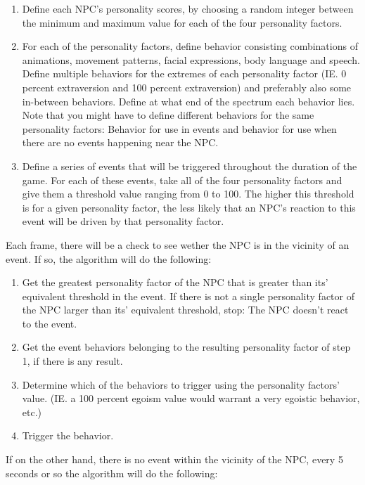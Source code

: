 \documentclass{article}
\begin{document}
    \begin{enumerate}
    	\item Define each NPC's personality scores, by choosing a random integer between the minimum and maximum value for each of the four personality factors.
    	\item For each of the personality factors, define behavior consisting combinations of animations, movement patterns, facial expressions, body language and speech. Define multiple behaviors for the extremes of each personality factor (IE. 0 percent extraversion and 100 percent extraversion) and preferably also some in-between behaviors. Define at what end of the spectrum each behavior lies. Note that you might have to define different behaviors for the same personality factors: Behavior for use in events and behavior for use when there are no events happening near the NPC.%
    	\item Define a series of events that will be triggered throughout the duration of the game. For each of these events, take all of the four personality factors and give them a threshold value ranging from 0 to 100. The higher this threshold is for a given personality factor, the less likely that an NPC's reaction to this event will be driven by that personality factor.
    \end{enumerate}

    Each frame, there will be a check to see wether the NPC is in the vicinity of an event. If so, the algorithm will do the following:

    \begin{enumerate}
    	\item Get the greatest personality factor of the NPC that is greater than its' equivalent threshold in the event. If there is not a single personality factor of the NPC larger than its' equivalent threshold, stop: The NPC doesn't react to the event.
    	\item Get the event behaviors belonging to the resulting personality factor of step 1, if there is any result. 
    	\item Determine which of the behaviors to trigger using the personality factors' value. (IE. a 100 percent egoism value would warrant a very egoistic behavior, etc.)
    	\item Trigger the behavior.
    \end{enumerate}

    If on the other hand, there is no event within the vicinity of the NPC, every 5 seconds or so the algorithm will do the following:
\end{document}
